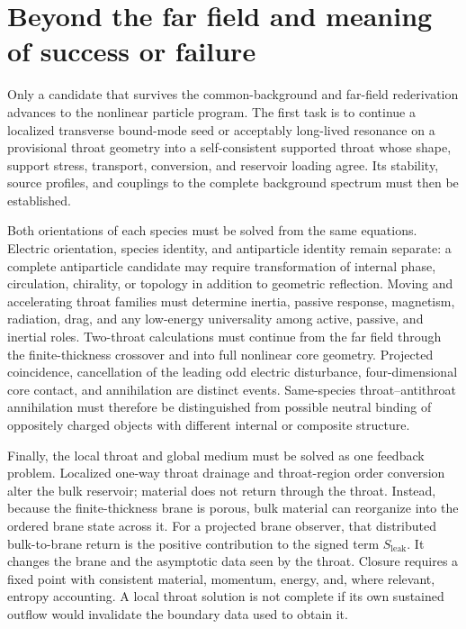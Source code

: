 \section{Beyond the far field and meaning of success or failure}

Only a candidate that survives the common-background and far-field rederivation
advances to the nonlinear particle program. The first task is to continue a
localized transverse bound-mode seed or acceptably long-lived resonance on a
provisional throat geometry into a self-consistent supported throat whose shape,
support stress, transport, conversion, and reservoir loading agree. Its stability,
source profiles, and couplings to the complete background spectrum must then be
established.

Both orientations of each species must be solved from the same equations. Electric
orientation, species identity, and antiparticle identity remain separate: a
complete antiparticle candidate may require transformation of internal phase,
circulation, chirality, or topology in addition to geometric reflection. Moving
and accelerating throat families must determine inertia, passive response,
magnetism, radiation, drag, and any low-energy universality among active, passive,
and inertial roles. Two-throat calculations must continue from the far field
through the finite-thickness crossover and into full nonlinear core geometry.
Projected coincidence, cancellation of the leading odd electric disturbance,
four-dimensional core contact, and annihilation are distinct events.
Same-species throat--antithroat annihilation must therefore be distinguished
from possible neutral binding of oppositely charged objects with different
internal or composite structure.

Finally, the local throat and global medium must be solved as one feedback
problem. Localized one-way throat drainage and throat-region order conversion
alter the bulk reservoir; material does not return through the throat. Instead,
because the finite-thickness brane is porous, bulk material can reorganize into
the ordered brane state across it. For a projected brane observer, that
distributed bulk-to-brane return is the positive contribution to the signed term
\(S_{\mathrm{leak}}\). It changes the brane and the asymptotic data seen by the
throat. Closure requires a fixed point with consistent material, momentum,
energy, and, where relevant, entropy accounting. A local throat solution is not
complete if its own sustained outflow would invalidate the boundary data used to
obtain it.

